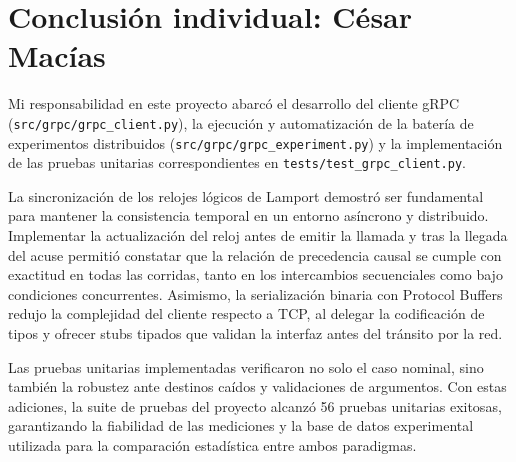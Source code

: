 \section{Conclusión individual: César Macías}

Mi responsabilidad en este proyecto abarcó el desarrollo del cliente gRPC
(\texttt{src/grpc/grpc\_client.py}), la ejecución y automatización de la batería
de experimentos distribuidos (\texttt{src/grpc/grpc\_experiment.py}) y la
implementación de las pruebas unitarias correspondientes en
\texttt{tests/test\_grpc\_client.py}.

La sincronización de los relojes lógicos de Lamport demostró ser fundamental para
mantener la consistencia temporal en un entorno asíncrono y distribuido. Implementar
la actualización del reloj antes de emitir la llamada y tras la llegada del acuse
permitió constatar que la relación de precedencia causal se cumple con exactitud en
todas las corridas, tanto en los intercambios secuenciales como bajo condiciones
concurrentes. Asimismo, la serialización binaria con Protocol Buffers redujo la
complejidad del cliente respecto a TCP, al delegar la codificación de tipos y
ofrecer stubs tipados que validan la interfaz antes del tránsito por la red.

Las pruebas unitarias implementadas verificaron no solo el caso nominal, sino
también la robustez ante destinos caídos y validaciones de argumentos. Con estas
adiciones, la suite de pruebas del proyecto alcanzó 56 pruebas unitarias exitosas,
garantizando la fiabilidad de las mediciones y la base de datos experimental
utilizada para la comparación estadística entre ambos paradigmas.
